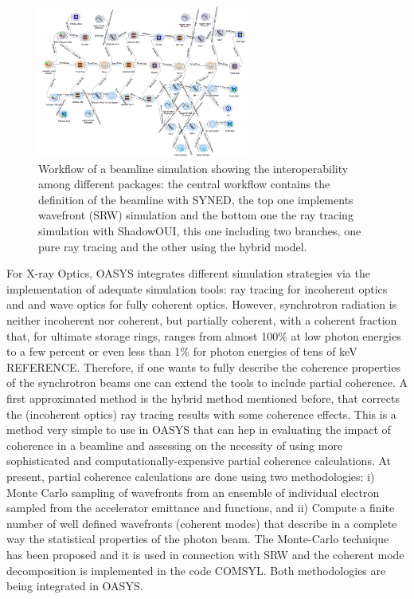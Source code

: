 \documentclass{aip-cp}
\begin{document}
\begin{figure}[hh]
\includegraphics[width=7cm]{FIGURES/id16a}
\caption{Workflow of a beamline simulation showing the interoperability among different packages: the central workflow contains the definition of the beamline with SYNED, the top one implements wavefront (SRW) simulation and the bottom one the ray tracing simulation with ShadowOUI, this one including two branches, one pure ray tracing and the other using the hybrid model.}
\label{figXoppy}
\end{figure}

For X-ray Optics, OASYS integrates different simulation strategies via the implementation of adequate simulation tools: ray tracing for incoherent optics and and wave optics for fully coherent optics. However, synchrotron radiation is neither incoherent nor coherent, but partially coherent, with a coherent fraction that, for ultimate storage rings, ranges from almost 100\% at low photon energies to a few percent or even less than 1\% for photon energies of tens of keV REFERENCE. Therefore, if one wants to fully describe the coherence properties of the synchrotron beams one can extend the tools to include partial coherence. A first approximated method is the hybrid method mentioned before, that corrects the (incoherent optics) ray tracing results with some coherence effects. This is a method very simple to use in OASYS that can hep in evaluating the impact of coherence in a beamline and assessing on the necessity of using more sophisticated and computationally-expensive partial coherence calculations.  At present, partial coherence calculations are done using two methodologies: i) Monte Carlo sampling of wavefronts from an ensemble of individual electron sampled from the accelerator emittance and functions, and ii) Compute a finite number of well defined wavefronts (coherent modes) that describe in a complete way the statistical properties of the photon beam. The Monte-Carlo technique has been proposed and it is used in connection with SRW \cite{srw2} and the coherent mode decomposition is implemented in the code COMSYL. Both methodologies are being integrated in OASYS.  
\end{document}
